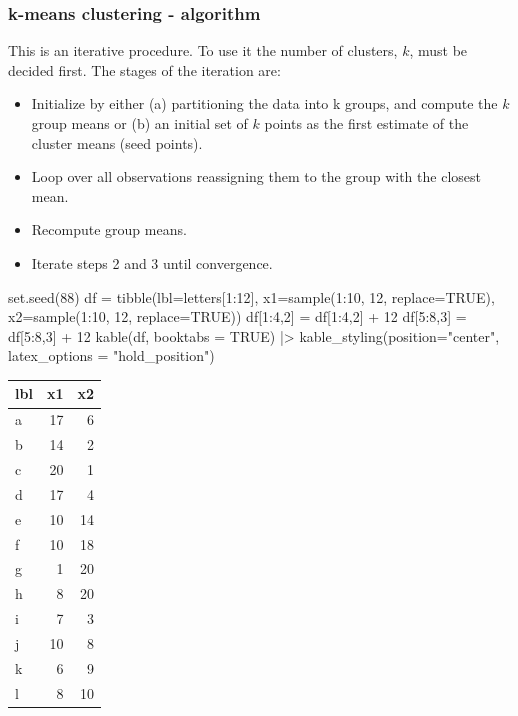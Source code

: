 \documentclass[a4paper]{article}\usepackage[]{graphicx}\usepackage[]{xcolor}
\begin{document}
\subsubsection{k-means clustering - algorithm}

This is an iterative procedure. To use it the number of clusters, \( k \), must be decided first.  The stages of the iteration are:
\begin{itemize}
	\item Initialize by either (a) partitioning the data into k groups, and compute the \( k \) group means or (b) an initial set of $k$ points as the first estimate of the cluster means (seed points).
	\item Loop over all observations reassigning them to the group with the closest mean.
	\item Recompute group means.
	\item Iterate steps 2 and 3 until convergence.
\end{itemize}
\begin{Schunk}
\begin{Sinput}
set.seed(88)
df = tibble(lbl=letters[1:12], 
			x1=sample(1:10, 12, replace=TRUE),
			x2=sample(1:10, 12, replace=TRUE))
df[1:4,2] = df[1:4,2] + 12
df[5:8,3] = df[5:8,3] + 12
kable(df, booktabs = TRUE) |>
  kable_styling(position="center", latex_options = "hold_position")
\end{Sinput}
\begin{table}[!h]
\centering
\begin{tabular}{lrr}
\toprule
lbl & x1 & x2\\
\midrule
a & 17 & 6\\
b & 14 & 2\\
c & 20 & 1\\
d & 17 & 4\\
e & 10 & 14\\
\addlinespace
f & 10 & 18\\
g & 1 & 20\\
h & 8 & 20\\
i & 7 & 3\\
j & 10 & 8\\
\addlinespace
k & 6 & 9\\
l & 8 & 10\\
\bottomrule
\end{tabular}
\end{table}

\end{Schunk}
\end{document}
